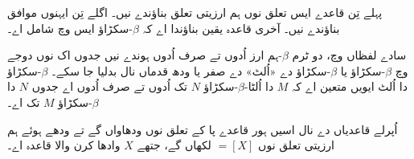 \documentclass[../../../include/open-logic-section]{subfiles}
\begin{document}
پہلے تِن قاعدے ایس تعلق نوں ہم ارزیتی تعلق بناؤندے نیں۔
اگلے تِن ایہنوں موافق بناؤندے نیں۔ آخری قاعدہ یقین بناؤندا اے
کہ $\beta$-سکڑاؤ ایس وچ شامل اے۔

سادے لفظاں وچ، دو ٹرم $\beta$-ہم ارز اُدوں تے صرف اُدوں
ہوندے نیں جدوں اک نوں دوجے وچ $\beta$-سکڑاؤ یا
$\beta$-سکڑاؤ دے «اُلٹ» دے صفر یا ودھ قدماں نال بدلیا جا
سکے۔ $\beta$-سکڑاؤ دا اُلٹ ایویں متعین اے کہ $M$ دا
اُلٹا-$\beta$-سکڑاؤ $N$ تک اُدوں تے صرف اُدوں اے جدوں $N$
دا $\beta$-سکڑاؤ $M$ تک اے۔

اُپرلے قاعدیاں دے نال اسیں ہور قاعدے پا کے تعلق نوں ودھاواں گے
تے ودھے ہوئے ہم ارزیتی تعلق نوں $\equal[X]$ لکھاں گے، جتھے $X$
وادھا کرن والا قاعدہ اے۔
\end{document}
